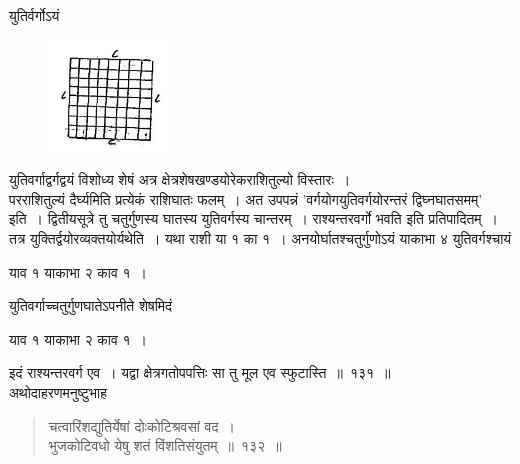 \documentclass[11pt, openany]{book}
\begin{document}
\vspace{-4mm}
 युतिर्वर्गोऽयं 
\vspace{-4mm}

\begin{figure}[h!]
    \centering
    \includegraphics[scale=0.9]{graphics/Capture17.png}
\end{figure}

युतिवर्गाद्वर्गद्वयं विशोध्य शेषं
\newpage
 अत्र क्षेत्रशेषखण्डयोरेकराशितुल्यो विस्तारः~। \\

\vspace{-4mm}
 परराशितुल्यं दैर्घ्यमिति प्रत्येकं राशिघातः फलम्~। अत उपपन्नं {\qt 'वर्गयोगयुतिवर्गयोरन्तरं द्विघ्नघातसमम्'} इति~। द्वितीयसूत्रे तु चतुर्गुणस्य
घातस्य युतिवर्गस्य चान्तरम्~। राश्यन्तरवर्गो भवति इति प्रतिपादितम्~। तत्र
युक्तिर्द्वयोरव्यक्तयोर्यथेति~। यथा राशी या १ का १~। अनयोर्घातश्चतुर्गुणोऽयं याकाभा ४ युतिवर्गश्चायं 
\vspace{-2mm}

\begin{center}
     याव १ याकाभा २ काव १~। 
\end{center}
\vspace{-2mm}

 युतिवर्गाच्चतुर्गुणघातेऽपनीते शेषमिदं 
\vspace{-2mm}

\begin{center}
    याव १ याकाभा २ काव १~। 
\end{center}
\vspace{-2mm}

इदं राश्यन्तरवर्ग एव~। यद्वा क्षेत्रगतोपपत्तिः सा तु मूल एव स्फुटास्ति~॥~१३१~॥~\\

\vspace{-2mm}
 अथोदाहरणमनुष्टुभाह\textendash
\begin{quote}
    \eg 
     चत्वारिंशद्युतिर्येषां दोःकोटिश्रवसां वद~। \\
 भुजकोटिवधो येषु शतं विंशतिसंयुतम्~॥~१३२~॥~
\end{quote}
\end{document}
